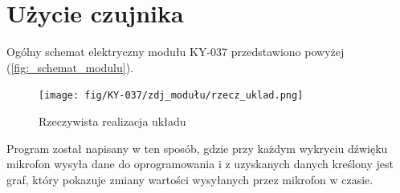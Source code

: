 \documentclass[11pt, a4paper]{article}
\begin{document}
\section{Użycie czujnika}
Ogólny schemat elektryczny modułu KY-037 przedstawiono powyżej (\ref{fig:_schemat_modulu}).
\vspace{0.25cm}

\begin{figure}[H]
    \centering
    \texttt{[image: fig/KY-037/zdj\_modułu/rzecz\_uklad.png]}
    \caption{Rzeczywista realizacja układu}
    \label{fig:my_label}
\end{figure}

Program został napisany w ten sposób, gdzie przy każdym wykryciu dźwięku mikrofon wysyła dane do oprogramowania i z uzyskanych danych kreślony jest graf, który pokazuje zmiany wartości wysyłanych przez mikrofon w czasie.

\newpage

\printbibliography[heading=bibintoc]
\end{document}
